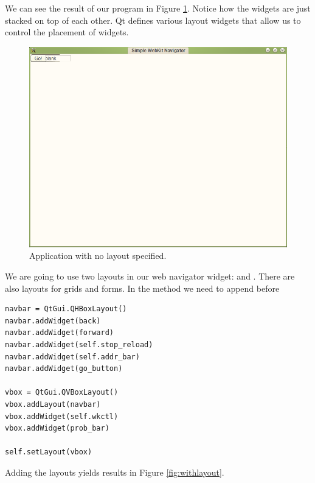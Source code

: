 We can see the result of our program in Figure \ref{fig:nolayout}.
Notice how the widgets are just stacked on top of each other.
Qt defines various layout widgets that allow us to control the placement of widgets. 
\begin{figure}[h]
\centering
\includegraphics[scale=.5]{nolayout.png}
\caption{Application with no layout specified.}
\label{fig:nolayout}
\end{figure}
We are going to use two layouts in our web navigator widget:  and .
There are also layouts for grids and forms.
In the  method we need to append before 
\begin{lstlisting}
navbar = QtGui.QHBoxLayout()
navbar.addWidget(back)
navbar.addWidget(forward)
navbar.addWidget(self.stop_reload)
navbar.addWidget(self.addr_bar)
navbar.addWidget(go_button)

vbox = QtGui.QVBoxLayout()
vbox.addLayout(navbar)
vbox.addWidget(self.wkctl)
vbox.addWidget(prob_bar)

self.setLayout(vbox)
\end{lstlisting}
Adding the layouts yields results in Figure \ref{fig:withlayout}.
